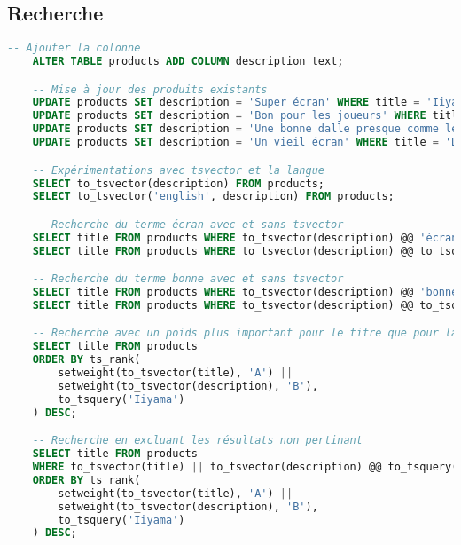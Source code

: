 \documentclass[a4paper,10pt]{article}
\begin{document}
  \subsection{Recherche}
    \begin{lstlisting}[language=SQL, gobble=4, tabsize=2, showstringspaces=false]
    -- Ajouter la colonne
    ALTER TABLE products ADD COLUMN description text;

    -- Mise à jour des produits existants
    UPDATE products SET description = 'Super écran' WHERE title = 'Iiyama';
    UPDATE products SET description = 'Bon pour les joueurs' WHERE title = 'Acer';
    UPDATE products SET description = 'Une bonne dalle presque comme le Iiyama' WHERE title = 'HP';
    UPDATE products SET description = 'Un vieil écran' WHERE title = 'Dell';

    -- Expérimentations avec tsvector et la langue
    SELECT to_tsvector(description) FROM products;
    SELECT to_tsvector('english', description) FROM products;

    -- Recherche du terme écran avec et sans tsvector
    SELECT title FROM products WHERE to_tsvector(description) @@ 'écran';
    SELECT title FROM products WHERE to_tsvector(description) @@ to_tsquery('écran');

    -- Recherche du terme bonne avec et sans tsvector
    SELECT title FROM products WHERE to_tsvector(description) @@ 'bonne';
    SELECT title FROM products WHERE to_tsvector(description) @@ to_tsquery('bonne');

    -- Recherche avec un poids plus important pour le titre que pour la description
    SELECT title FROM products
    ORDER BY ts_rank(
        setweight(to_tsvector(title), 'A') ||
        setweight(to_tsvector(description), 'B'),
        to_tsquery('Iiyama')
    ) DESC;

    -- Recherche en excluant les résultats non pertinant
    SELECT title FROM products
    WHERE to_tsvector(title) || to_tsvector(description) @@ to_tsquery('Iiyama')
    ORDER BY ts_rank(
        setweight(to_tsvector(title), 'A') ||
        setweight(to_tsvector(description), 'B'),
        to_tsquery('Iiyama')
    ) DESC;
    \end{lstlisting}
\end{document}
